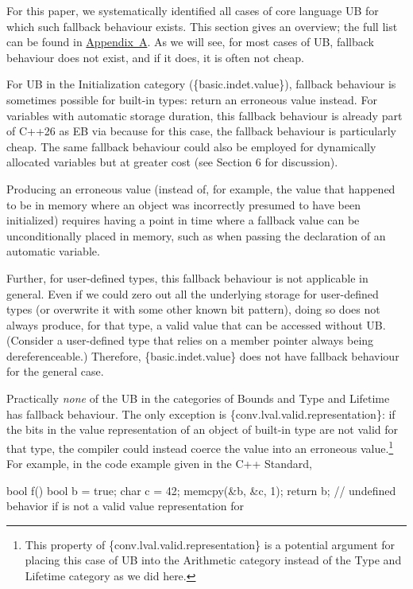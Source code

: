 {For this paper, we systematically identified all cases of core language UB for which such fallback behaviour exists. This section gives an overview; the full list can be found in \hyperref[appendix]{Appendix~A}. As we will see, for most cases of UB, fallback behaviour does not exist, and if it does, it is often not cheap.

For UB in the Initialization category (\{basic.indet.value\}), fallback behaviour is sometimes possible for built-in types: return an erroneous value instead. For variables with automatic storage duration, this fallback behaviour is already part of C++26 as EB via \cite{P2795R5} because for this case, the fallback behaviour is particularly cheap. The same fallback behaviour could also be employed for dynamically allocated variables but at greater cost (see \cite{P2723R1} Section 6 for discussion).

Producing an erroneous value (instead of, for example, the value that happened to be in memory where an object was incorrectly presumed to have been initialized) requires having a point in time where a fallback value can be unconditionally placed in memory, such as when passing the declaration of an automatic variable.

Further, for user-defined types, this fallback behaviour is not applicable in general. Even if we could zero out all the underlying storage for user-defined types (or overwrite it with some other known bit pattern), doing so does not always produce, for that type, a valid value that can be accessed without UB. (Consider a user-defined type that relies on a member pointer always being dereferenceable.) Therefore, \{basic.indet.value\} does not have fallback behaviour for the general case.

Practically \emph{none} of the UB in the categories of Bounds and Type and Lifetime has fallback behaviour. The only exception is \{conv.lval.valid.representation\}: if the bits in the value representation of an object of built-in type are not valid for that type, the compiler could instead coerce the value into an erroneous value.\footnote{This property of \{conv.lval.valid.representation\} is a potential argument for placing this case of UB into the Arithmetic category instead of the Type and Lifetime category as we did here.} For example, in the code example given in the C++ Standard,

\begin{codeblock}
bool f() {
  bool b = true;
  char c = 42;
  memcpy(&b, &c, 1);
  return b;         // undefined behavior if  is not a valid value representation for 
}
\end{codeblock}

}
